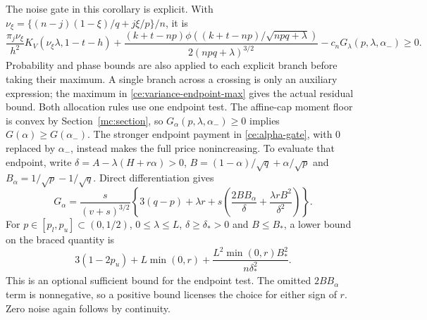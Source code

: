 The noise gate in this corollary is explicit. With
$\nu_\xi=\{(n-j)(1-\xi)/q+j\xi/p\}/n$, it is
\[
 \frac{\pi_j\nu_\xi}{h^2}K_V(\nu_\xi\lambda,1-t-h)
 +\frac{(k+t-np)\phi((k+t-np)/\sqrt{npq+\lambda})}
               {2(npq+\lambda)^{3/2}}
 -c_nG_\lambda(p,\lambda,\alpha_-)\ge0.
\]
Probability and phase bounds are also applied to each explicit branch
before taking their maximum. A single branch across a crossing is
only an auxiliary expression; the maximum in
\eqref{ce:variance-endpoint-max} gives the actual residual bound.
Both allocation rules use one endpoint test. The affine-cap moment
floor is convex by Section~\ref{mc:section}, so
$G_\alpha(p,\lambda,\alpha_-)\ge0$ implies $G(\alpha)\ge G(\alpha_-)$.
The stronger endpoint payment in \eqref{ce:alpha-gate}, with $0$
replaced by $\alpha_-$, instead makes the full price nonincreasing.
To evaluate that endpoint, write $\delta=A-\lambda(H+r\alpha)>0$,
$B=(1-\alpha)/\sqrt q+\alpha/\sqrt p$ and
$B_\alpha=1/\sqrt p-1/\sqrt q$. Direct differentiation gives
\begin{equation}\label{ce:signed-allocation-derivative}
 G_\alpha=\frac{s}{(v+s)^{3/2}}
 \left\{3(q-p)+\lambda r+s\left(
 \frac{2BB_\alpha}{\delta}+\frac{\lambda rB^2}{\delta^2}\right)\right\}.
\end{equation}
For $p\in[p_l,p_u]\subset(0,1/2)$, $0\le\lambda\le L$,
$\delta\ge\delta_*>0$ and $B\le B_*$, a lower bound on the
braced quantity is
\begin{equation}\label{ce:signed-allocation-gate}
 3(1-2p_u)+L\min(0,r)
       +\frac{L^2\min(0,r)B_*^2}{n\delta_*^2}.
\end{equation}
This is an optional sufficient bound for the endpoint test.
The omitted $2BB_\alpha$ term is nonnegative, so a positive bound
licenses the choice for either sign of $r$.
Zero noise again follows by continuity.
